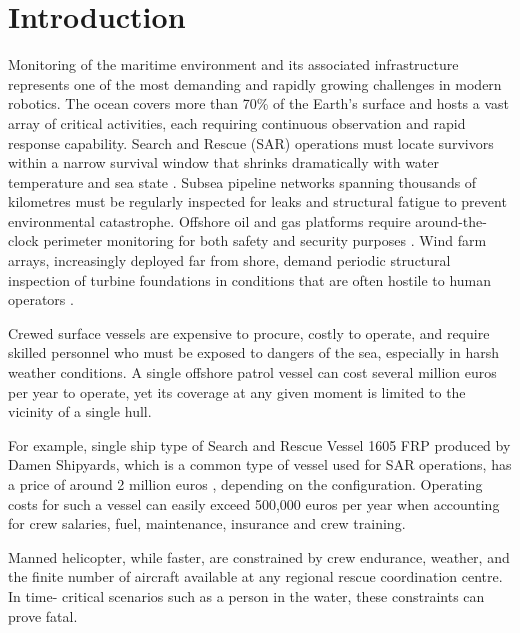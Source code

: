 \section{Introduction}
\label{sec:introduction}

Monitoring of the maritime environment and its associated infrastructure 
represents one of the most demanding and rapidly growing challenges in 
modern robotics. The ocean covers more than 70\% 
of the Earth's surface and hosts a vast array of critical activities, 
each requiring continuous observation and rapid response capability. 
Search and Rescue (SAR) operations must locate survivors within a narrow 
survival window that shrinks dramatically with water temperature and sea 
state \cite{iamsar2022}. Subsea pipeline networks spanning thousands of 
kilometres must be regularly inspected for leaks and structural fatigue 
to prevent environmental catastrophe. Offshore 
oil and gas platforms require around-the-clock perimeter monitoring for 
both safety and security purposes \cite{eu_blue_economy_infra2026}. Wind farm 
arrays, increasingly deployed far from shore, demand periodic structural 
inspection of turbine foundations in conditions that are often hostile to 
human operators \cite{winspector2019}.

Crewed surface vessels are expensive to procure, costly to operate, and require skilled personnel who must be exposed to dangers of the sea, especially in harsh weather conditions. A single offshore 
patrol vessel can cost several million euros per year to operate, yet 
its coverage at any given moment is limited to the vicinity of a single 
hull.

For example, single ship type of Search and Rescue Vessel 1605 FRP produced by Damen Shipyards, which is a common type of vessel used for SAR operations, has a price of around 2 million euros \cite{damen_sar1605}, depending on the configuration. Operating costs for such a vessel can easily exceed 500,000 euros per year when accounting for crew salaries, fuel, maintenance, insurance and crew training.

Manned helicopter, while faster, are 
constrained by crew endurance, weather, and the finite number of 
aircraft available at any regional rescue coordination centre. In time-
critical scenarios such as a person in the water, these constraints can 
prove fatal.

